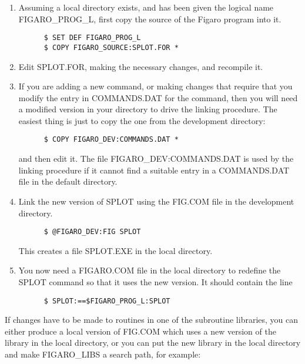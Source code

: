 \begin{enumerate}

\item Assuming a local directory exists, and has been given the logical
name FIGARO\_PROG\_L, first copy the source of the Figaro program into it.

\begin{verbatim}
      $ SET DEF FIGARO_PROG_L
      $ COPY FIGARO_SOURCE:SPLOT.FOR *
\end{verbatim}

\item Edit SPLOT.FOR, making the necessary changes, and recompile it.

\item If you are adding a new command, or making changes that require that
you modify the entry in COMMANDS.DAT for the command, then you will need a
modified version in your directory to drive the linking procedure.  The
easiest thing is just to copy the one from the development directory:

\begin{verbatim}
      $ COPY FIGARO_DEV:COMMANDS.DAT *
\end{verbatim}

and then edit it. The file FIGARO\_DEV:COMMANDS.DAT is used by the linking
procedure if it cannot find a suitable entry in a COMMANDS.DAT file in the
default directory.

\item Link the new version of SPLOT using the FIG.COM file in the
development directory.

\begin{verbatim}
      $ @FIGARO_DEV:FIG SPLOT
\end{verbatim}

This creates a file SPLOT.EXE in the local directory.

\item You now need a FIGARO.COM file in the local directory to redefine
the SPLOT command so that it uses the new version. It should contain the line

\begin{verbatim}
      $ SPLOT:==$FIGARO_PROG_L:SPLOT
\end{verbatim}

\end{enumerate}

If changes have to be made to routines in one of the subroutine libraries, you
can either produce a local version of FIG.COM which uses a new version of the
library in the local directory, or you can put the new library in the local
directory and make FIGARO\_LIBS a search path, for example:

